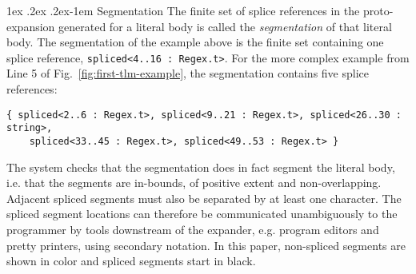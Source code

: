 \documentclass[acmsmall]{acmart}
\makeatletter
\renewcommand{\subsubsection}{%
  \@startsection{subsubsection}{3}%
  {\z@}{1ex \@plus .2ex \@minus .2ex}{-1em}%
  {\normalfont\normalsize\bfseries}%
}
\newcommand{\li}[1]{\lstinline[basicstyle=\ttfamily\fontsize{9pt}{1em}\selectfont]{#1}}
\newcommand{\lismall}[1]{\lstinline[basicstyle=\ttfamily\fontsize{9pt}{1em}\selectfont]{#1}}
\makeatother
\begin{document}

\subsubsection{Segmentation}\label{sec:segmentation}
The finite set of splice references in the proto-expansion generated for a literal body is called the \emph{segmentation} of that literal body. The segmentation of the example above is the finite set containing one splice reference, \lismall{spliced<4..16 : Regex.t>}. For the more complex example from Line 5 of Fig.~\ref{fig:first-tlm-example}, the segmentation contains five splice references:
\begin{lstlisting}[numbers=none]
  { spliced<2..6 : Regex.t>, spliced<9..21 : Regex.t>, spliced<26..30 : string>, 
    spliced<33..45 : Regex.t>, spliced<49..53 : Regex.t> } 
\end{lstlisting}
The system checks that the segmentation does in fact segment the literal body, i.e. that the segments are in-bounds, of positive extent and non-overlapping. Adjacent spliced segments must also be separated by at least one character. The spliced segment locations can therefore be communicated unambiguously to the programmer by tools downstream of the expander, e.g. program editors and pretty printers, using secondary notation. In this paper, non-spliced segments are shown in color and spliced segments start in black.  
\end{document}
